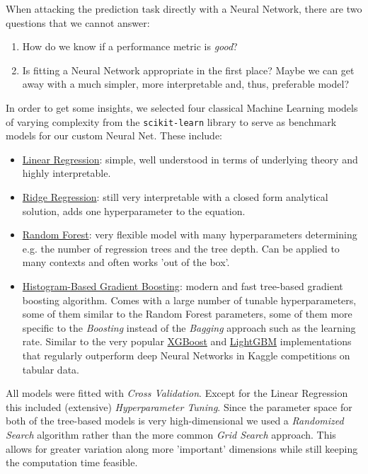 \documentclass[12pt, letterpaper]{article}
\begin{document}
When attacking the prediction task directly with a Neural Network, there are two questions that we cannot answer:
\begin{enumerate}
    \item How do we know if a performance metric is \emph{good}?
    \item Is fitting a Neural Network appropriate in the first place?
          Maybe we can get away with a much simpler, more interpretable and, thus, preferable model?
\end{enumerate}
In order to get some insights, we selected four classical Machine Learning models of varying complexity from the \texttt{scikit-learn} library \cite{pedregosa2011} to serve as benchmark models for our custom Neural Net.
These include:
\begin{itemize}
    \item \href{https://scikit-learn.org/stable/modules/generated/sklearn.linear_model.LinearRegression.html}{Linear Regression}: simple, well understood in terms of underlying theory and highly interpretable.
    \item \href{https://scikit-learn.org/stable/modules/generated/sklearn.linear_model.Ridge.html}{Ridge Regression}: still very interpretable with a closed form analytical solution, adds one hyperparameter to the equation.
    \item \href{https://scikit-learn.org/stable/modules/generated/sklearn.ensemble.RandomForestRegressor.html}{Random Forest}: very flexible model with many hyperparameters determining e.g. the number of regression trees and the tree depth.
          Can be applied to many contexts and often works 'out of the box'.
    \item \href{https://scikit-learn.org/stable/modules/generated/sklearn.ensemble.HistGradientBoostingRegressor.html}{Histogram-Based Gradient Boosting}: modern and fast tree-based gradient boosting algorithm.
          Comes with a large number of tunable hyperparameters, some of them similar to the Random Forest parameters, some of them more specific to the \emph{Boosting} instead of the \emph{Bagging} approach such as the learning rate.
          Similar to the very popular \href{https://xgboost.readthedocs.io/en/stable/}{XGBoost} \cite{chen2016} and \href{https://lightgbm.readthedocs.io/en/latest/}{LightGBM} \cite{ke2017} implementations that regularly outperform deep Neural Networks in Kaggle competitions on tabular data.
\end{itemize}

All models were fitted with \emph{Cross Validation}.
Except for the Linear Regression this included (extensive) \emph{Hyperparameter Tuning}.
Since the parameter space for both of the tree-based models is very high-dimensional we used a \emph{Randomized Search} algorithm \cite{bergstra2012} rather than the more common \emph{Grid Search} approach.
This allows for greater variation along more 'important' dimensions while still keeping the computation time feasible.
\end{document}
